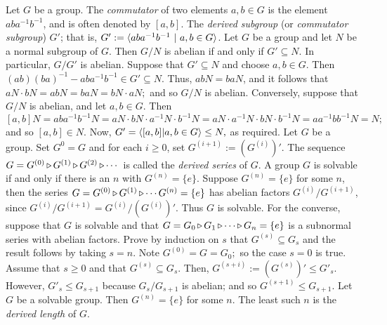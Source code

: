  Let $G$ be a group. The \emph{commutator} of two elements $a,b \in G$ is the element $aba^{-1}b^{-1}$, and is often denoted by $[a,b]$. The \emph{derived subgroup} (or \emph{commutator subgroup}) $G'$; that is, 
$G' := \langle aba^{-1}b^{-1}\ |\ a,b \in G \rangle$.
 Let $G$ be a group and let $N$ be a normal subgroup of $G$. Then $G/N$ is abelian if and only if $G' \subseteq N$. In particular, $G/ G'$ is abelian.
\wpf{} Suppose that $G' \subseteq N$ and choose $a,b \in G$. Then $(ab)(ba)^{-1} - aba^{-1}b^{-1} \in G' \subseteq N$. 
Thus, $abN = baN$, and it follows that 
$aN\cdot bN = abN = baN = bN \cdot aN;$ 
and so $G/N$ is abelian.
Conversely, suppose that $G/N$ is abelian, and let $a,b \in G$. Then 
$[a,b]N = aba^{-1}b^{-1}N = aN\cdot bN \cdot a^{-1}N \cdot b^{-1}N = aN \cdot a^{-1}N \cdot bN \cdot b^{-1}N = aa^{-1}bb^{-1}N = N;$
and so $[a, b] \in N$. Now, 
$G'  = \langle [a,b] | a,b \in G \rangle \le N,$ 
as required.
 Let $G$ be a group. Set $G^0 = G$ and for each $i \ge 0$, set $G^{(i+1)} := (G^{(i)})'.$ The sequence
$G = G^{(0)} \operatorname{\triangleright} G^{(1)} \operatorname{\triangleright} G^{(2)} \operatorname{\triangleright} \cdots$ is called the \emph{derived series} of $G$.
 A group $G$ is solvable if and only if there is an $n$ with $G^{(n)} = \{e\}$.
\wpf{} Suppose $G^{(n)} = \{e\}$ for some $n$, then the series 
$G = G^{(0)} \operatorname{\triangleright} G^{(1)} \operatorname{\triangleright} \cdots G^{(n)} = \{e\}$ 
has abelian factors $G^{(i)}/G^{(i+1)}$, since $G^{(i)}/G^{(i+1)} = G^{(i)}/(G^{(i)})'$. Thus $G$ is solvable.
For the converse, suppose that $G$ is solvable and that 
$G = G_0 \operatorname{\triangleright} G_1 \operatorname{\triangleright} \cdots \operatorname{\triangleright} G_n = \{e\}$
is a subnormal series with abelian factors. Prove by induction on $s$ that $G^{(s)} \subseteq G_s$ and the result follows by taking $s = n$. 
Note $G^{(0)} = G = G_0;$ so the case $s = 0$ is true. Assume that $s \ge 0$ and that $G^{(s)} \subseteq G_s.$ Then, $G^{(s+i)} := (G^{(s)})' \le G'_s$. However, $G'_s \le G_{s+1}$ because $G_s/G_{s+1}$ is abelian; and so $G^{(s+1)} \le G_{s+1}$.
 Let $G$ be a solvable group. Then $G^{(n)} = \{e\}$ for some $n$. The least such $n$ is the \emph{derived length} of $G$.